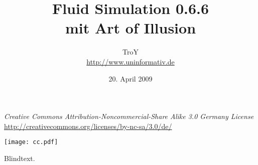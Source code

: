 \documentclass[12pt,a4paper]{scrartcl}
\begin{document}
\author{TroY \\ \url{http://www.uninformativ.de}}
\title{Fluid Simulation 0.6.6 \\ mit Art of Illusion}
\date{20. April 2009}
\maketitle
\thispagestyle{empty}

\vspace{110mm}

\begin{center}
	\textit{Creative Commons Attribution-Noncommercial-Share Alike 3.0 Germany License} \\
	\url{http://creativecommons.org/licenses/by-nc-sa/3.0/de/}

	\texttt{[image: cc.pdf]}
\end{center}

\pagebreak



Blindtext.
\end{document}
